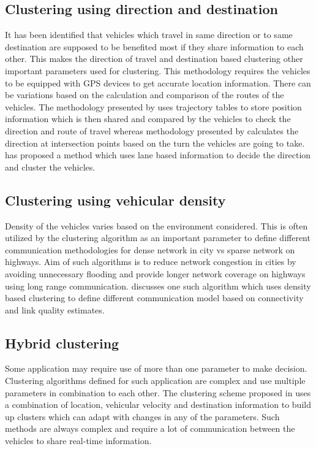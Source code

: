\documentclass[]{ccs-thesis}
\begin{document}
\subsection{Clustering using direction and destination}

It has been identified that vehicles which travel in same direction or to same destination are supposed to be benefited
most if they share information to each other. This makes the direction of travel and destination based clustering other
important parameters used for clustering. This methodology requires the vehicles to be equipped with \ac{GPS} devices to
get accurate location information. There can be variations based on the calculation and comparison of the routes of the
vehicles. The methodology presented by \textcite{6685518} uses trajectory tables to store position information which is
then shared and compared by the vehicles to check the direction and route of travel whereas methodology presented
by \textcite{5416361} calculates the direction at intersection points based on the turn the vehicles are going to take.
\textcite{5735785} has proposed a method which uses lane based information to decide the direction and cluster the vehicles.

\subsection{Clustering using vehicular density}

Density of the vehicles varies based on the environment considered. This is often utilized by the clustering
algorithm as an important parameter to define different communication methodologies for dense network in city vs
sparse network on highways. Aim of such algorithms is to reduce network congestion in cities by avoiding unnecessary
flooding and provide longer network coverage on highways using long range communication. \textcite{4976256} discusses
one such algorithm which uses density based clustering to define different communication model based on connectivity and
link quality estimates.

\subsection{Hybrid clustering}

Some application may require use of more than one parameter to make decision. Clustering algorithms defined for such
application are complex and use multiple parameters in combination to each other. The clustering scheme proposed
in \cite{6077004} uses a combination of location, vehicular velocity and destination information to build up clusters
which can adapt with changes in any of the parameters. Such methods are always complex and require a lot of communication
between the vehicles to share real-time information.
\end{document}
